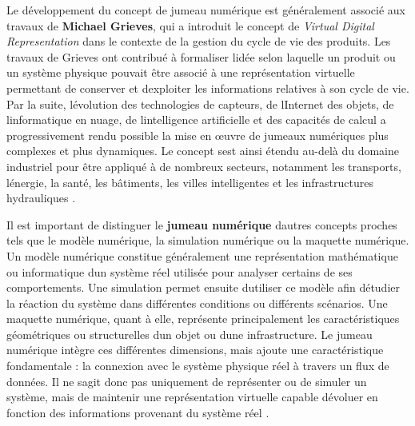 \documentclass[12pt,a4paper,oneside]{report}
\begin{document}
Le développement du concept de jumeau numérique est généralement associé
aux travaux de \textbf{Michael Grieves}, qui a introduit le concept de
\emph{Virtual Digital Representation} dans le contexte de la gestion du
cycle de vie des produits. Les travaux de Grieves ont contribué à
formaliser l\textquotesingle idée selon laquelle un produit ou un
système physique pouvait être associé à une représentation virtuelle
permettant de conserver et d\textquotesingle exploiter les informations
relatives à son cycle de vie. Par la suite, l\textquotesingle évolution
des technologies de capteurs, de l\textquotesingle Internet des objets,
de l\textquotesingle informatique en nuage, de
l\textquotesingle intelligence artificielle et des capacités de calcul a
progressivement rendu possible la mise en œuvre de jumeaux numériques
plus complexes et plus dynamiques. Le concept s\textquotesingle est
ainsi étendu au-delà du domaine industriel pour être appliqué à de
nombreux secteurs, notamment les transports, l\textquotesingle énergie,
la santé, les bâtiments, les villes intelligentes et les infrastructures
hydrauliques \cite{ref59}.

Il est important de distinguer le \textbf{jumeau numérique}
d\textquotesingle autres concepts proches tels que le modèle numérique,
la simulation numérique ou la maquette numérique. Un modèle numérique
constitue généralement une représentation mathématique ou informatique
d\textquotesingle un système réel utilisée pour analyser certains de ses
comportements. Une simulation permet ensuite d\textquotesingle utiliser
ce modèle afin d\textquotesingle étudier la réaction du système dans
différentes conditions ou différents scénarios. Une maquette numérique,
quant à elle, représente principalement les caractéristiques
géométriques ou structurelles d\textquotesingle un objet ou
d\textquotesingle une infrastructure. Le jumeau numérique intègre ces
différentes dimensions, mais ajoute une caractéristique fondamentale :
la connexion avec le système physique réel à travers un flux de données.
Il ne s\textquotesingle agit donc pas uniquement de représenter ou de
simuler un système, mais de maintenir une représentation virtuelle
capable d\textquotesingle évoluer en fonction des informations provenant
du système réel \cite{ref17}.
\end{document}
